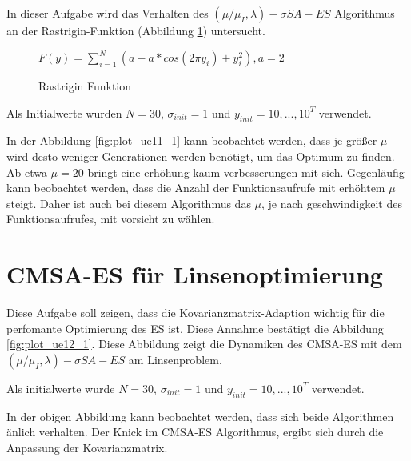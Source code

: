 In dieser Aufgabe wird das Verhalten des $(\mu/\mu_I,\lambda)-\sigma SA-ES$ Algorithmus an der Rastrigin-Funktion (Abbildung \ref{fig:rastrigin}) untersucht.

\begin{figure}[h]
  \label{fig:rastrigin}
  \begin{center}
  
    $F(y)=\sum_{i=1}^N(a-a*cos(2\pi y_i)+y_i^2), a=2$
    
  \end{center}
  \caption{Rastrigin Funktion}
  \label{fig:rastrigin}
\end{figure}

Als Initialwerte wurden $N=30$, $\sigma_{init}=1$ und $y_{init}={10,...,10}^T$ verwendet.


In der Abbildung \ref{fig:plot_ue11_1} kann beobachtet werden, dass je größer $\mu$ wird desto weniger Generationen werden benötigt, um das Optimum zu finden. Ab etwa $\mu = 20$ bringt eine erhöhung kaum verbesserungen mit sich. Gegenläufig kann beobachtet werden, dass die Anzahl der Funktionsaufrufe mit erhöhtem $\mu$ steigt. Daher ist auch bei diesem Algorithmus das $\mu$, je nach geschwindigkeit des Funktionsaufrufes, mit vorsicht zu wählen.

\chapter{CMSA-ES für Linsenoptimierung}

Diese Aufgabe soll zeigen, dass die Kovarianzmatrix-Adaption wichtig für die perfomante Optimierung des ES ist. Diese Annahme bestätigt die Abbildung \ref{fig:plot_ue12_1}. Diese Abbildung zeigt die Dynamiken des CMSA-ES mit dem $(\mu/\mu_I,\lambda)-\sigma SA-ES$ am Linsenproblem.

Als initialwerte wurde $N=30$, $\sigma_{init}=1$ und $y_{init}={10,...,10}^T$ verwendet.


In der obigen Abbildung kann beobachtet werden, dass sich beide Algorithmen änlich verhalten. Der Knick im CMSA-ES Algorithmus, ergibt sich durch die Anpassung der Kovarianzmatrix.




